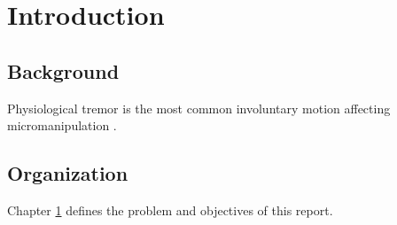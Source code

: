 \chapter{Introduction}
\label{ch:Introduction}

\section{Background}

Physiological tremor is the most common involuntary motion affecting micromanipulation \cite{Aye1209:Vision}. 

\section{Organization}

Chapter \ref{ch:Introduction} defines the problem and objectives of this report. 
